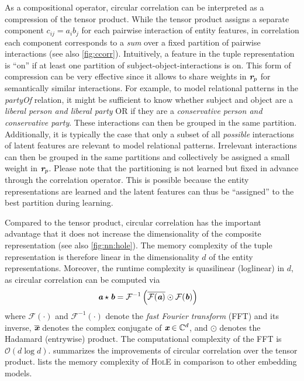 \documentclass[letterpaper]{article}
\renewcommand{\vec}[1]{\textit{\textbf{#1}}}
\newcommand{\vx}{\vec{x}}
\newcommand{\va}{\vec{a}}
\newcommand{\vb}{\vec{b}}
\newcommand{\ccorr}{\star}
\newcommand{\conj}[1]{\overline{#1}}
\newcommand{\hole}{\textsc{HolE}\xspace}
\newcommand{\hadamard}{\odot}
\newcommand{\fft}{\mathcal{F}}
\newcommand{\ifft}{\mathcal{F}^{-1}}
\newcommand{\BigO}{\mathcal{O}}
\begin{document}
As a compositional operator, circular correlation can be interpreted as a
compression of the tensor product. While the tensor product assigns a separate
component $c_{ij} = a_ib_j$ for each pairwise interaction of entity features, in correlation each
component corresponds to a \emph{sum} over a fixed partition of pairwise
interactions (see also \cref{fig:ccorr}).
Intuitively, a feature in the tuple representation is ``on'' if at least one
partition of subject-object-interactions is on.
This form of compression can be very effective since it allows to share weights
in $\vec{r}_p$ for semantically similar interactions. For example, to model
relational patterns in the \textit{partyOf} relation, it might be sufficient to
know whether subject and object are a \textit{liberal person and liberal party}
OR if they are a \textit{conservative person and conservative party}. These
interactions can then be grouped in the same partition.
Additionally, it is typically the case that only a
subset of all \emph{possible} interactions of latent features are relevant to model
relational patterns. Irrelevant interactions can then be grouped in the same
partitions and collectively be assigned a small weight in $\vec{r}_p$.
Please note that the partitioning is not learned but fixed in advance through
the correlation operator. This is possible because the entity representations
are learned and the latent features can thus be ``assigned'' to the best
partition during learning.


Compared to the tensor product, circular correlation has the important advantage
that it does not increase the dimensionality of the composite representation
(see also \cref{fig:nn:hole}).
The memory complexity of the tuple representation is therefore linear in the
dimensionality $d$ of the entity representations. Moreover, the runtime complexity is 
quasilinear (loglinear) in $d$, as circular correlation can be computed via
\begin{align*}
  \va \ccorr \vb & = \ifft \left( \conj{\fft(\va)} \hadamard \fft(\vb) \right)
\end{align*}
where $\fft(\cdot)$ and $\ifft(\cdot)$ denote the \emph{fast Fourier transform} (FFT)
and its inverse, $\conj{\vx}$ denotes the complex conjugate of ${\vx \in \mathbb{C}^d}$,
and $\hadamard$ denotes the Hadamard (entrywise) product.
The computational complexity of the FFT is $\BigO(d \log d)$.
 summarizes the improvements of circular correlation over the
tensor product.  lists the memory complexity of \hole in comparison to
other embedding models.
\end{document}

